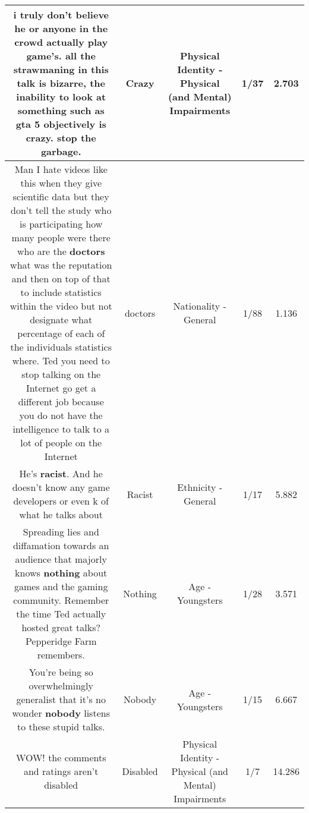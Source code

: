 \documentclass[11pt]{article}
\newlength\mylength
\begin{document}
\begin{center}
\begin{longtable}{|C{.65\mylength}|C{.30\mylength}|C{.12\mylength}|C{.12\mylength}|C{.12\mylength}|}
  \small i truly don't believe he or anyone in the crowd actually play game's. all the strawmaning in this talk is bizarre, the inability to look at something such as gta 5 objectively is \textbf{crazy}. stop the garbage.\normalsize   & Crazy & Physical Identity - Physical (and Mental) Impairments & 1/37 & 2.703 \\  \hline
  \small Man I hate videos like this when they give scientific data but they don't tell the study who is participating how many people were there who are the \textbf{doctors} what was the reputation and then on top of that to include statistics within the video but not designate what percentage of each of the individuals statistics where. Ted you need to stop talking on the Internet go get a different job because you do not have the intelligence to talk to a lot of people on the Internet\normalsize   & doctors & Nationality - General & 1/88 & 1.136 \\  \hline
  \small He's \textbf{racist}. And he doesn't know any game developers or even k of what he talks about\normalsize   & Racist & Ethnicity - General & 1/17 & 5.882 \\  \hline
  \small Spreading lies and diffamation towards an audience that majorly knows \textbf{nothing} about games and the gaming community. Remember the time Ted actually hosted great talks? Pepperidge Farm remembers.\normalsize   & Nothing & Age - Youngsters & 1/28 & 3.571 \\  \hline
  \small You're being so overwhelmingly generalist that it's no wonder \textbf{nobody} listens to these stupid talks.\normalsize   & Nobody & Age - Youngsters & 1/15 & 6.667 \\  \hline
  \small WOW! the comments and ratings aren't disabled\normalsize   & Disabled & Physical Identity - Physical (and Mental) Impairments & 1/7 & 14.286 \\  \hline

\end{longtable}
\end{center}
\end{document}
